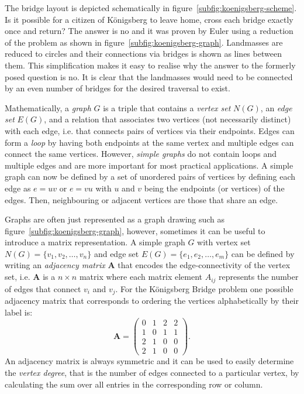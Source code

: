 %
The bridge layout is depicted schematically in
figure~\ref{subfig:koenigsberg-scheme}. Is it possible for a citizen of
K\"onigsberg to leave home, cross each bridge exactly once and return? The
answer is no and it was proven by Euler using a reduction of the problem as
shown in figure~\ref{subfig:koenigsberg-graph}. Landmasses are reduced to
circles and their connections via bridges is shown as lines between them. This
simplification makes it easy to realise why the answer to the formerly posed
question is no. It is clear that the landmasses would need to be connected by an
even number of bridges for the desired traversal to exist.

Mathematically, a \textit{graph} $G$ is a triple that contains a \textit{vertex
set} $N(G)$, an \textit{edge set} $E(G)$, and a relation that associates two
vertices (not necessarily distinct) with each edge, i.e. that connects pairs of
vertices via their endpoints. Edges can form a \textit{loop} by having both
endpoints at the same vertex and multiple edges can connect the same vertices.
However, \textit{simple graphs} do not contain loops and multiple edges and are
more important for most practical applications. A simple graph can now be
defined by a set of unordered pairs of vertices by defining each edge as $e=uv$
or $e=vu$ with $u$ and $v$ being the endpoints (or vertices) of the edges. Then,
neighbouring or adjacent vertices are those that share an edge.

Graphs are often just represented as a graph drawing such as
figure~\ref{subfig:koenigsberg-graph}, however, sometimes it can be useful to
introduce a matrix representation. A simple graph $G$ with vertex set
$N(G)=\{v_1,v_2,\dots,v_n\}$ and edge set $E(G)=\{e_1,e_2,\dots,e_m\}$ can be
defined by writing an \textit{adjacency matrix} $\mathbf{A}$ that encodes the
edge-connectivity of the vertex set, i.e. $\mathbf{A}$ is a $n\times n$ matrix
where each matrix element $A_{ij}$ represents the number of edges that connect
$v_i$ and $v_j$. For the K\"onigsberg Bridge problem one possible adjacency
matrix that corresponds to ordering the vertices alphabetically by their label
is:
%
\begin{equation}
    \mathbf{A}=
    \begin{pmatrix}
         0 & 1 & 2 & 2\\
         1 & 0 & 1 & 1\\
         2 & 1 & 0 & 0\\
         2 & 1 & 0 & 0
    \end{pmatrix}.
\end{equation}
%
An adjacency matrix is always symmetric and it can be used to easily determine
the \textit{vertex degree}, that is the number of edges connected to a
particular vertex, by calculating the sum over all entries in the corresponding
row or column. 

